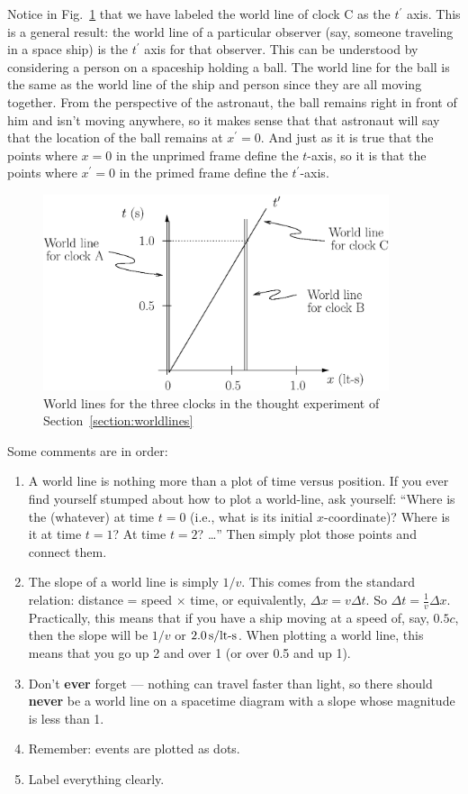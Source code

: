 Notice in Fig.~\ref{fig:worldlines1} that we have labeled the world
line of clock C as the $t^\prime$ axis.  This is a general result: the
world line of a particular observer (say, someone traveling in a space
ship) is the $t^\prime$ axis for that observer.  This can be
understood by considering a person on a spaceship holding a ball. The
world line for the ball is the same as the world line of the ship and
person since they are all moving together.  From the perspective of
the astronaut, the ball remains right in front of him and isn't moving
anywhere, so it makes sense that that astronaut will say that the
location of the ball remains at $x^\prime = 0$.  And just as it is
true that the points where $x = 0$ in the unprimed frame define the
$t$-axis, so it is that the points where $x^\prime = 0$ in the primed
frame define the $t^\prime$-axis.
    
\begin{figure}[tbp]
\begin{center}
\includegraphics[width=4in]{relativistic_spacetime/worldlines1.eps}
\end{center}
\caption{World lines for the three clocks in the thought experiment
of Section~\ref{section:worldlines}}
\label{fig:worldlines1}
\end{figure}

Some comments are in order:
\begin{enumerate}
\item A world line is nothing more than a plot of time versus
position.  If you ever find yourself stumped about how to plot a
world-line, ask yourself: ``Where is the (whatever) at time $t=0$
(i.e., what is its initial $x$-coordinate)?  Where is it at time 
$t=1$?  At time $t=2$?  \dots''  Then simply plot those points 
and connect them.
\item The slope of a world line is simply $1/v$.  This comes from the
  standard relation: distance = speed $\times$ time, or equivalently, 
  $\Delta x= v \Delta t$.   So $\Delta t =
  \frac{1}{v}\Delta x$.  Practically, this means that if you have a ship
  moving at a speed of, say, $0.5c$, then the slope will be $1/ v$ or
  $2.0\,\mbox{s/lt-s}$.  When plotting a world line, this means that
  you go up 2 and over 1 (or over 0.5 and up 1).
\item Don't {\bf ever} forget --- nothing can travel faster than
light, so there should {\bf never} be a world line on a spacetime diagram
 with a
slope whose magnitude is less than 1.  
\item Remember: events are plotted as dots.
\item Label everything clearly.
\end{enumerate}

